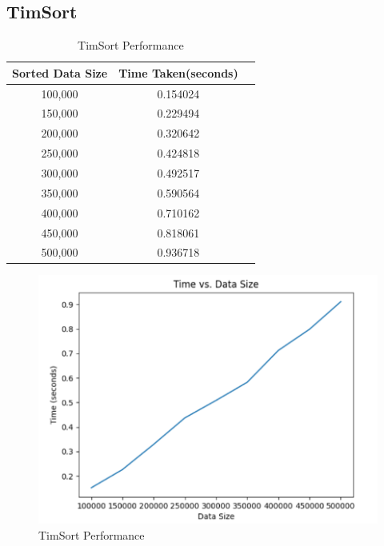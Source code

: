 \documentclass[a4paper, 9pt, twocolumn]{article}
\begin{document}
\subsection*{TimSort}
\begin{table}[h]
  \centering
  \label{tab:tim_sort_table}
  \caption{TimSort Performance}
  \begin{tabular}{|c|c|c|}
    \hline
    \textbf{Sorted Data Size} & \textbf{Time Taken(seconds)} \\
    \hline
    100,000                   & 0.154024                     \\
    150,000                   & 0.229494                     \\
    200,000                   & 0.320642                     \\
    250,000                   & 0.424818                     \\
    300,000                   & 0.492517                     \\
    350,000                   & 0.590564                     \\
    400,000                   & 0.710162                     \\
    450,000                   & 0.818061                     \\
    500,000                   & 0.936718                     \\
    \hline
  \end{tabular}
\end{table}

\begin{figure}[h]
  \centering
  \includegraphics[width=0.8\linewidth]{tim_sort.png}  %
  \caption{TimSort Performance}
  \label{fig:tim_sort}
\end{figure}
\end{document}
